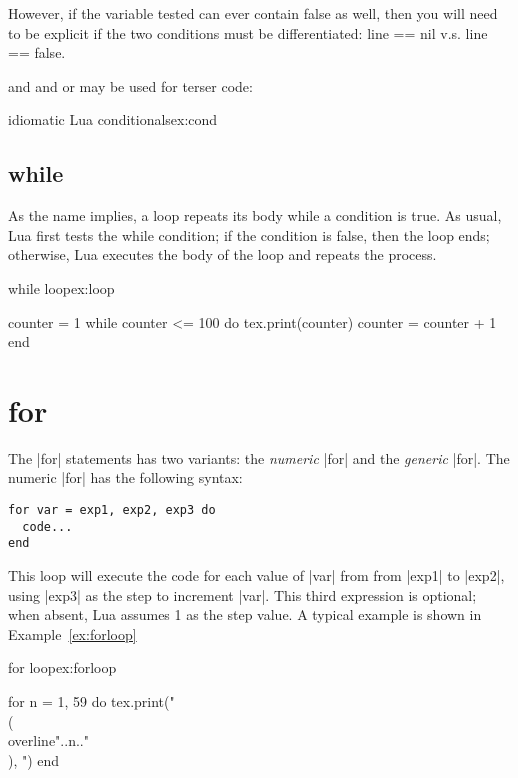 However, if the variable tested can ever contain false as well, then you will need to be explicit if the two conditions must be differentiated: line == nil v.s. line == false.

and and or may be used for terser code:

\begin{texexample}{idiomatic Lua conditionals}{ex:cond}
\end{texexample}


\subsection*{while}

As the name implies, a  loop repeats its body while a condition is true. As
usual, Lua first tests the while condition; if the condition is false, then the loop
ends; otherwise, Lua executes the body of the loop and repeats the process.

\begin{texexample}{while loop}{ex:loop}
\begin{luacode}
   counter = 1
   while counter <= 100 do
      tex.print(counter)
      counter = counter + 1
   end
\end{luacode}
\end{texexample}


\let\exec\directlua


\section{for}

The |for| statements has two variants: the \emph{numeric} |for| and the \emph{generic} |for|. The 
numeric |for| has the following syntax:
\begin{verbatim}
for var = exp1, exp2, exp3 do
  code...
end  
\end{verbatim}

This loop will execute the code for each value of |var| from from |exp1| to |exp2|, using
|exp3| as the step to increment |var|. This third expression is optional; when
absent, Lua assumes 1 as the step value. A typical example is shown in Example~\ref{ex:forloop}

\begin{texexample}{for loop}{ex:forloop}
\begin{luacode}
for n = 1, 59 do
   tex.print("\\(\\overline{"..n.."}\\), ")
end
\end{luacode}
\end{texexample}

